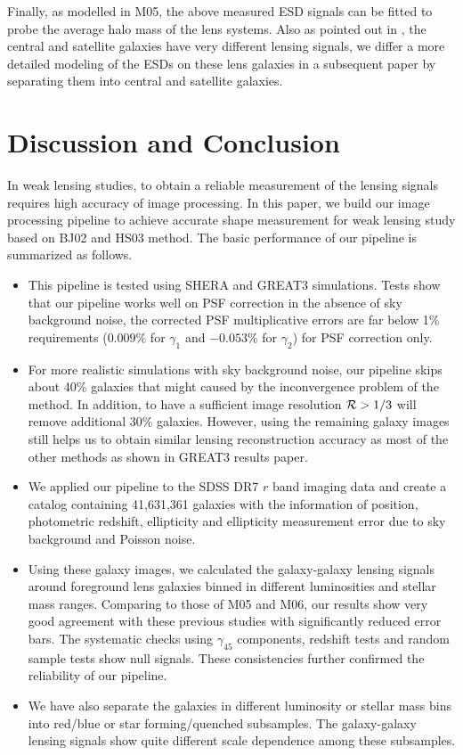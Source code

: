 \documentclass[apj]{emulateapj}
\begin{document}
Finally, as modelled in M05, the above measured ESD signals can be
fitted to probe the average halo mass of the lens systems. Also as
pointed out in \citet{Yang2006a}, the central and satellite galaxies
have very different lensing signals, we differ a more detailed
modeling of the ESDs on these lens galaxies in a subsequent paper
by separating them into central and satellite galaxies. 
 



\section{Discussion and Conclusion}
\label{sec_summary}

In weak lensing studies, to obtain a reliable measurement of the
lensing signals requires high accuracy of image processing. In this
paper, we build our image processing pipeline to achieve accurate
shape measurement for weak lensing study based on BJ02 and HS03
method. The basic performance of our pipeline is summarized as
follows.
%
\begin{itemize}
\item This pipeline is tested using SHERA and GREAT3 simulations.
  Tests show that our pipeline works well on PSF correction in the
  absence of sky background noise, the corrected PSF multiplicative
  errors are far below 1\% requirements ($0.009\%$ for $\gamma_1$ and
  $-0.053\%$ for $\gamma_2$) for PSF correction only.

\item For more realistic simulations with sky background noise, our
  pipeline skips about 40\% galaxies that might caused by the
  inconvergence problem of the method. In addition, to have a
  sufficient image resolution ${\cal R}>1/3$ will remove additional
  30\% galaxies. However, using the remaining galaxy images still
  helps us to obtain similar lensing reconstruction accuracy as most
  of the other methods as shown in GREAT3 results paper\citep{Mandelbaum2015}.

\item We applied our pipeline to the SDSS DR7 $r$ band imaging data
  and create a catalog containing 41,631,361 galaxies with the
  information of position, photometric redshift, ellipticity and
  ellipticity measurement error due to sky background and Poisson
  noise.

\item Using these galaxy images, we calculated the galaxy-galaxy
  lensing signals around foreground lens galaxies binned in different
  luminosities and stellar mass ranges. Comparing to those of M05 and
  M06, our results show very good agreement with these previous
  studies with significantly reduced error bars. The systematic checks
  using $\gamma_{45}$ components, redshift tests and random sample
  tests show null signals. These consistencies further confirmed the
  reliability of our pipeline.

\item We have also separate the galaxies in different luminosity or
  stellar mass bins into red/blue or star forming/quenched
  subsamples. The galaxy-galaxy lensing signals show quite different
  scale dependence among these subsamples.
\end{itemize}
\end{document}
